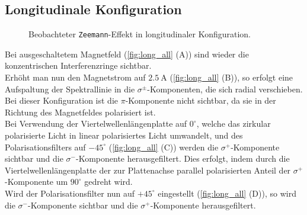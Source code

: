 \subsection{Longitudinale Konfiguration}
\begin{figure}[ht]
    \centering
    \caption{Beobachteter \texttt{Zeemann}-Effekt in longitudinaler Konfiguration.}
\end{figure}
\noindent Bei ausgeschaltetem Magnetfeld (\cref{fig:long_all} (A)) sind wieder die konzentrischen Interferenzringe sichtbar.
\vspace{0.2cm}\\
\noindent Erhöht man nun den Magnetstrom auf $\SI{2,5}{\ampere}$ (\cref{fig:long_all} (B)), so erfolgt eine Aufspaltung der Spektrallinie in die $\sigma^\pm$-Komponenten, die sich radial verschieben. Bei dieser Konfiguration ist die $\pi$-Komponente nicht sichtbar, da sie in der Richtung des Magnetfeldes polarisiert ist.
\vspace{0.2cm}\\
\noindent Bei Verwendung der Viertelwellenlängenplatte auf $0^{\circ}$, welche das zirkular polarisierte Licht in linear polarisiertes Licht umwandelt, und des Polarisationsfilters auf $-45^{\circ}$ (\cref{fig:long_all} (C)) werden die $\sigma^+$-Komponente sichtbar und die $\sigma^-$-Komponente herausgefiltert. Dies erfolgt, indem durch die Viertelwellenlängenplatte der zur Plattenachse parallel polarisierten Anteil der $\sigma^+$-Komponente um $90^{\circ}$ gedreht wird.
\vspace{0.2cm}\\
\noindent Wird der Polarisationsfilter nun auf $+45^{\circ}$ eingestellt (\cref{fig:long_all} (D)), so wird die $\sigma^-$-Komponente sichtbar und die $\sigma^+$-Komponente herausgefiltert.\\